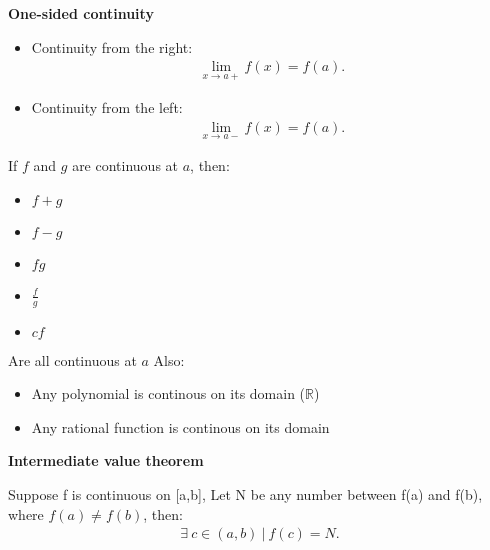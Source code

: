 \documentclass{report}
\begin{document}
      \bigbreak \noindent \bigbreak \noindent 
      \begin{large}
          \textbf{One-sided continuity}
      \end{large}      \begin{itemize}
        \item Continuity from the right:
          \begin{align*}
            \lim\limits_{x \to a+}{f(x)=f(a)}
          .\end{align*}
        \item Continuity from the left:
          \begin{align*}
            \lim\limits_{x \to a-}{f(x)=f(a)}
          .\end{align*}
      \end{itemize}
      \bigbreak \noindent \bigbreak \noindent
      If $f$ and $g $ are continuous at $a $, then:
      \begin{itemize}
        \item $f+g $
        \item $f-g $
        \item $fg $
        \item $\frac{f}{g} $
        \item $cf $
      \end{itemize}
      \bigbreak \noindent 
      Are all continuous at $a $
      \bigbreak \noindent \bigbreak \noindent
      Also:
      \begin{itemize}
        \item Any polynomial is continous on its domain ($ \mathbb{R} $)
        \item Any rational function is continous on its domain
      \end{itemize}
      \bigbreak \noindent \bigbreak \noindent

      \pagebreak \bigbreak \noindent
      \begin{large}
          \textbf{Intermediate value theorem}
      \end{large}
            \bigbreak \noindent \bigbreak \noindent
      Suppose f is continuous on [a,b], Let N be any number between f(a) and f(b), where $f(a) \neq f(b)$, then:
      \begin{align*}
        \exists\ c \in (a,b)\ |\ f(c) = N
      .\end{align*}
\end{document}
